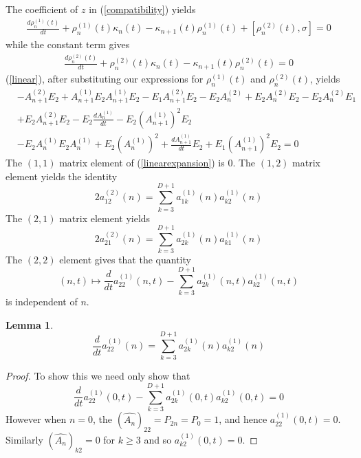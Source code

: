 \documentclass[12pt]{article}
\newtheorem{lemma}[theorem]{Lemma}
\theoremstyle{definition}
\begin{document}
The coefficient of $z$ in (\ref{compatibility}) yields
\begin{align}\label{linear}
\frac{d \rho_n^{(1)}(t)}{dt} + \rho_n^{(1)}(t) \kappa_n(t)  - \kappa_{n+1}(t) \rho_n^{(1)}(t) + [\rho_n^{(2)}(t),\sigma] = 0
\end{align}
while the constant term gives
\begin{align}\label{constant}
\frac{d \rho_n^{(2)}(t)}{dt}+\rho_n^{(2)}(t)\kappa_n(t)-\kappa_{n+1}(t) \rho_n^{(2)}(t)=0
\end{align}
(\ref{linear}), after substituting our expressions for $\rho^{(1)}_{n}(t)$ and $\rho^{(2)}_n(t)$,  yields
\begin{equation}\label{linearexpansion}
\begin{split}
&-A^{(2)}_{n+1} E_2 + A^{(1)}_{n+1} E_2 A^{(1)}_{n+1} E_2 - E_1 A^{(2)}_{n+1} E_2 - E_2 A^{(2)}_n + E_2 A^{(2)}_n E_2 - E_2 A^{(2)}_n E_1 \\
&+E_2 A^{(2)}_{n+1} E_2 - E_2  \frac{d A^{(1)}_n}{dt} - E_2 (A^{(1)}_{n + 1})^2 E_2 \\
&-E_2 A^{(1)}_{n} E_2 A^{(1)}_n + E_2 (A^{(1)}_n)^2 + \frac{d A^{(1)}_{n+1}}{dt} E_2 + E_1 (A^{(1)}_{n+1})^2 E_2 = 0
\end{split}
\end{equation}
The $(1,1)$ matrix element of (\ref{linearexpansion}) is $0$. The $(1,2)$ matrix element yields the identity
\begin{equation}\label{identity1}
2 a_{12}^{(2)} (n) =\sum_{k=3}^{D+1}  a_{1k}^{(1)} (n) a_{k2}^{(1)}(n)
\end{equation}
The $(2,1)$ matrix element yields
\begin{equation}\label{identity2}
2 a_{21}^{(2)} (n) =\sum_{k=3}^{D+1}  a_{2k}^{(1)} (n) a_{k1}^{(1)}(n)
\end{equation}
The $(2,2)$ element gives that the quantity
$$(n,t) \mapsto \frac{d}{dt}a_{22}^{(1)}(n,t) - \sum_{k=3}^{D+1} a_{2k}^{(1)}(n,t) a_{k2}^{(1)}(n,t)  $$
is independent of $n$.
\begin{lemma}\label{nequal0}
$$\frac{d}{dt}a_{22}^{(1)}(n) = \sum_{k=3}^{D+1} a_{2k}^{(1)}(n) a_{k2}^{(1)}(n)  $$
\end{lemma}
\begin{proof}
To show this we need only show that
$$\frac{d}{dt}a_{22}^{(1)}(0,t) - \sum_{k=3}^{D+1} a_{2k}^{(1)}(0,t) a_{k2}^{(1)}(0,t) = 0$$
However when $n=0$, the $(\widehat{A_n})_{22} = P_{2n} = P_0 = 1$, and hence $a_{22}^{(1)}(0,t) = 0$. Similarly $(\widehat{A_n})_{k2} = 0$ for $k \geq 3$ and so $a_{k2}^{(1)}(0,t) = 0$.
\end{proof}
\end{document}
